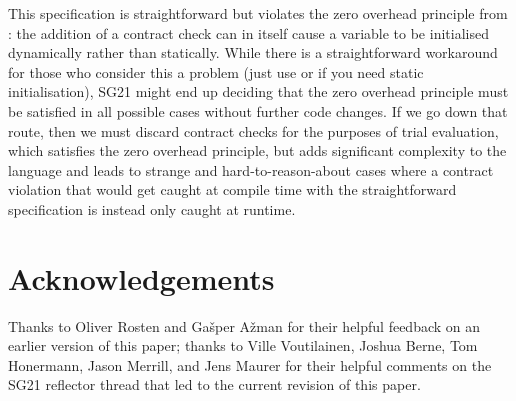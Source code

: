 This specification is straightforward but violates the zero overhead principle from \cite{P2932R1}: the addition of a contract check can in itself cause a variable to be initialised dynamically rather than statically. While there is a straightforward workaround for those who consider this a problem (just use  or  if you need static initialisation), SG21 might end up deciding that the zero overhead principle must be satisfied in all possible cases without further code changes. If we go down that route, then we must discard contract checks for the purposes of trial evaluation, which satisfies the zero overhead principle, but adds significant complexity to the language and leads to strange and hard-to-reason-about cases where a contract violation that would get caught at compile time with the straightforward specification is instead only caught at runtime.



\section*{Acknowledgements}

Thanks to Oliver Rosten and Ga\v sper A\v zman for their helpful feedback on an earlier version of this paper; thanks to Ville Voutilainen, Joshua Berne, Tom Honermann, Jason Merrill, and Jens Maurer for their helpful comments on the SG21 reflector thread that led to the current revision of this paper.

\renewcommand{\bibname}{References}





